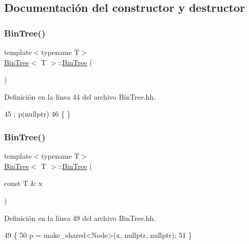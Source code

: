 \subsection{Documentación del constructor y destructor}
\mbox{\label{class_bin_tree_a47eef22d29cd023449d97c073c08e5b6}} 
\subsubsection{\texorpdfstring{Bin\+Tree()}{BinTree()}\hspace{0.1cm}{\footnotesize\ttfamily [1/3]}}
{\footnotesize\ttfamily template$<$typename T$>$ \\
\mbox{\hyperlink{class_bin_tree}{Bin\+Tree}}$<$ T $>$\+::\mbox{\hyperlink{class_bin_tree}{Bin\+Tree}} (\begin{DoxyParamCaption}{ }\end{DoxyParamCaption})}



Definición en la línea 44 del archivo Bin\+Tree.\+hh.


\begin{DoxyCode}
45     :   p(\textcolor{keyword}{nullptr})
46     \{   \}
\end{DoxyCode}
\mbox{\label{class_bin_tree_a1ab686e0bcf990093ff91fe71744c1a4}} 
\subsubsection{\texorpdfstring{Bin\+Tree()}{BinTree()}\hspace{0.1cm}{\footnotesize\ttfamily [2/3]}}
{\footnotesize\ttfamily template$<$typename T$>$ \\
\mbox{\hyperlink{class_bin_tree}{Bin\+Tree}}$<$ T $>$\+::\mbox{\hyperlink{class_bin_tree}{Bin\+Tree}} (\begin{DoxyParamCaption}\item[{const T \&}]{x }\end{DoxyParamCaption})\hspace{0.3cm}{\ttfamily [explicit]}}



Definición en la línea 49 del archivo Bin\+Tree.\+hh.


\begin{DoxyCode}
49                                   \{
50         p = make\_shared<Node>(x, \textcolor{keyword}{nullptr}, \textcolor{keyword}{nullptr});
51     \}
\end{DoxyCode}
\mbox{\label{class_bin_tree_adb7eeff76d08130c943b36af215eb521}} 

